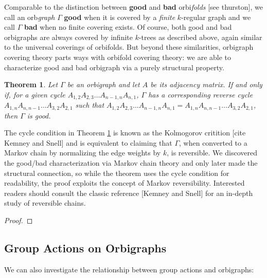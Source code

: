 \documentclass[12pt]{article}
\theoremstyle{plain}
\newtheorem{theorem}{Theorem}
\theoremstyle{definition}
\theoremstyle{remark}
\begin{document}
    Comparable to the distinction between \textbf{good} and \textbf{bad} orbi\textit{folds} [see thurston], we call an orb\textit{graph} $\Gamma$ \textbf{good} when it is covered by a \textit{finite} $k$-regular graph and we call $\Gamma$ \textbf{bad} when no finite covering exists. Of course, both good and bad orbigraphs are always covered by infinite $k$-trees as described above, again similar to the universal coverings of orbifolds. But beyond these similarities, orbigraph covering theory parts ways with orbifold covering theory: we are able to characterize good and bad orbigraph via a purely structural property.

    \begin{theorem}\label{thm:GoodBadCharacterization}
      Let $\Gamma$ be an orbigraph and let $A$ be its adjacency matrix. If and only if, for a given cycle $A_{1,2} A_{2,3} \ldots A_{n-1, n} A_{n, 1}$, $\Gamma$ has a corresponding reverse cycle $A_{1, n} A_{n, n-1} \ldots A_{3,2} A_{2,1}$ such that $A_{1,2} A_{2,3} \ldots A_{n-1, n} A_{n, 1} = A_{1, n} A_{n, n-1} \ldots A_{3,2} A_{2,1}$, then $\Gamma$ is good.
    \end{theorem}

    The cycle condition in Theorem \ref{thm:GoodBadCharacterization} is known as the Kolmogorov critition [cite Kemney and Snell] and is equivalent to claiming that $\Gamma$, when converted to a Markov chain by normalizing the edge weights by $k$, is reversible. We discovered the good/bad characterization via Markov chain theory and only later made the structural connection, so while the theorem uses the cycle condition for readability, the proof exploits the concept of Markov reversibility. Interested readers should consult the classic reference [Kemney and Snell] for an in-depth study of reversible chains.

    \begin{proof}
      
    \end{proof}


  \subsection{Group Actions on Orbigraphs}

    We can also investigate the relationship between group actions and orbigraphs:
\end{document}
